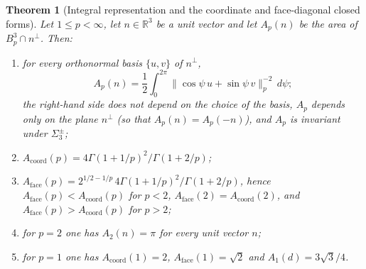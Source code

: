 \documentclass[11pt]{article}
\theoremstyle{plain}
\newtheorem{theorem}{Theorem}
\numberwithin{theorem}{section}
\begin{document}
\begin{theorem}[Integral representation and the coordinate and face-diagonal closed forms]\label{thm:integral}
Let $1\le p<\infty$, let $n\in\mathbb{R}^3$ be a unit vector and let $A_p(n)$ be the area of $B_p^3\cap n^{\perp}$. Then:
\begin{enumerate}
\item[(i)] for every orthonormal basis $\{u,v\}$ of $n^{\perp}$,
\[
A_p(n)=\frac12\int_0^{2\pi}\big\|\cos\psi\,u+\sin\psi\,v\big\|_p^{-2}\,d\psi;
\]
the right-hand side does not depend on the choice of the basis, $A_p$ depends only on the plane $n^{\perp}$ (so that $A_p(n)=A_p(-n)$), and $A_p$ is invariant under $\Sigma_3^{\pm}$;
\item[(ii)] $A_{\mathrm{coord}}(p)=4\Gamma(1+1/p)^2/\Gamma(1+2/p)$;
\item[(iii)] $A_{\mathrm{face}}(p)=2^{1/2-1/p}\,4\Gamma(1+1/p)^2/\Gamma(1+2/p)$, hence $A_{\mathrm{face}}(p)<A_{\mathrm{coord}}(p)$ for $p<2$, $A_{\mathrm{face}}(2)=A_{\mathrm{coord}}(2)$, and $A_{\mathrm{face}}(p)>A_{\mathrm{coord}}(p)$ for $p>2$;
\item[(iv)] for $p=2$ one has $A_2(n)=\pi$ for every unit vector $n$;
\item[(v)] for $p=1$ one has $A_{\mathrm{coord}}(1)=2$, $A_{\mathrm{face}}(1)=\sqrt2$ and $A_1(d)=3\sqrt3/4$.
\end{enumerate}
\end{theorem}
\end{document}
